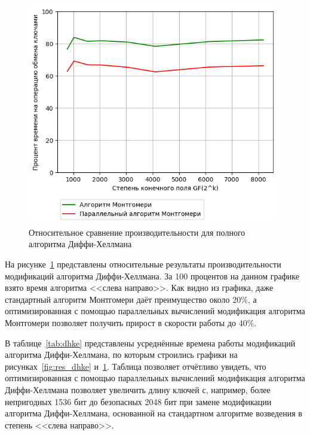 \documentclass[times,specification,annotation]{itmo-student-thesis}
\begin{document}
\begin{figure}[!h]
\caption{Относительное сравнение производительности для полного алгоритма Диффи-Хеллмана}\label{fig:res_dhke_per}
\includegraphics[width=11cm]{graphics/results_dhke_percent_ru.png}
\end{figure}

На рисунке~\ref{fig:res_dhke_per} представлены относительные результаты производительности модификаций алгоритма Диффи-Хеллмана.
За 100 процентов на данном графике взято время алгоритма <<слева направо>>.
Как видно из графика, даже стандартный алгоритм Монтгомери даёт преимущество около 20\%, а оптимизированная с помощью параллельных
вычислений модификация алгоритма Монтгомери позволяет получить прирост в скорости работы до 40\%.

В таблице~\ref{tab:dhke} представлены усреднённые времена работы модификаций алгоритма Диффи-Хеллмана, по которым
строились графики на рисунках~\ref{fig:res_dhke} и~\ref{fig:res_dhke_per}.
Таблица позволяет отчётливо увидеть, что оптимизированная с помощью параллельных вычислений модификация алгоритма
Диффи-Хеллмана позволяет увеличить длину ключей с, например, более непригодных 1536 бит до безопасных 2048 бит при замене
модификации алгоритма Диффи-Хеллмана, основанной на стандартном алгоритме возведения в степень <<слева направо>>.
\end{document}
